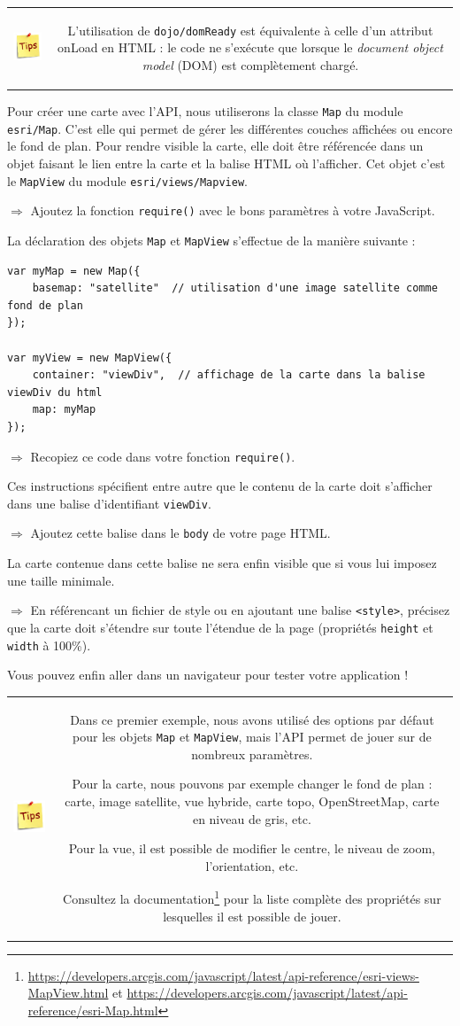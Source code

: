 \documentclass[11pt]{article}
\newcommand{\action}{$\Rightarrow$ }
\newenvironment{note}{%
	\begin{tabular}[t t]{c c}
		\includegraphics{img/tips.png}
		 &
		\begin{minipage}[c]{0.9\linewidth}
			\begin{sffamily}
}{%
			\end{sffamily}
		\end{minipage}
	\end{tabular}
}
\newcommand{\code}[1]{\lstinline{#1}}
\begin{document}
\begin{note}
L'utilisation de \code{dojo/domReady} est équivalente à celle d'un attribut onLoad en HTML : le code ne s'exécute que lorsque le \textit{document object model} (DOM) est complètement chargé.
\end{note}

Pour créer une carte avec l'API, nous utiliserons la classe \code{Map} du module \code{esri/Map}. 
C'est elle qui permet de gérer les différentes couches affichées ou encore le fond de plan. 
Pour rendre visible la carte, elle doit être référencée dans un objet faisant le lien entre la carte et la balise HTML où l'afficher. 
Cet objet c'est le \code{MapView} du module \code{esri/views/Mapview}.

\action Ajoutez la fonction \code{require()} avec le bons paramètres à votre JavaScript.

La déclaration des objets \code{Map} et \code{MapView} s'effectue de la manière suivante :
\begin{lstlisting}
var myMap = new Map({
    basemap: "satellite"  // utilisation d'une image satellite comme fond de plan
});

var myView = new MapView({
	container: "viewDiv",  // affichage de la carte dans la balise viewDiv du html
	map: myMap
});
\end{lstlisting}

\action Recopiez ce code dans votre fonction \code{require()}.

Ces instructions spécifient entre autre que le contenu de la carte doit s'afficher dans une balise d'identifiant \code{viewDiv}.

\action Ajoutez cette balise dans le \code{body} de votre page HTML.

La carte contenue dans cette balise ne sera enfin visible que si vous lui imposez une taille minimale.

\action En référencant un fichier de style ou en ajoutant une balise \code{<style>}, précisez que la carte doit s'étendre sur toute l'étendue de la page (propriétés \code{height} et \code{width} à 100\%).

Vous pouvez enfin aller dans un navigateur pour tester votre application !

\begin{note}
Dans ce premier exemple, nous avons utilisé des options par défaut pour les objets \code{Map} et \code{MapView}, mais l'API permet de jouer sur de nombreux paramètres.

Pour la carte, nous pouvons par exemple changer le fond de plan : carte, image satellite, vue hybride, carte topo, OpenStreetMap, carte en niveau de gris, etc.

Pour la vue, il est possible de modifier le centre, le niveau de zoom, l'orientation, etc.

Consultez la documentation\footnote{\url{https://developers.arcgis.com/javascript/latest/api-reference/esri-views-MapView.html} et \url{https://developers.arcgis.com/javascript/latest/api-reference/esri-Map.html}} pour la liste complète des propriétés sur lesquelles il est possible de jouer.
\end{note}
\end{document}
